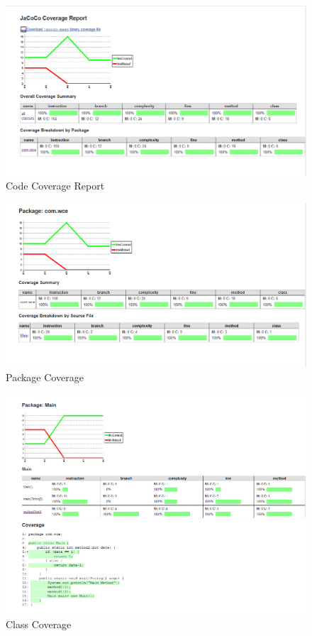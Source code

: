 \documentclass[a4paper,oneside,1,english1pt]{report}
\begin{document}
		\begin{figure}[h]
		\includegraphics[width=\linewidth]{screenshots/CoverageReport.png}
			\caption{Code Coverage Report}
			
		\end{figure}
		
		
		\begin{figure}[h]
			\includegraphics[width=\linewidth]{screenshots/PackageCoverage.png}
			\caption{Package Coverage}
			
		\end{figure}
		
		
		\begin{figure}[h]
			\includegraphics[width=\linewidth]{screenshots/ClassCoverage.png}
			\caption{Class Coverage}
		\end{figure}
\end{document}
